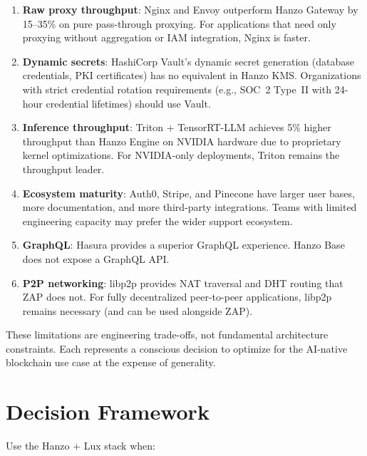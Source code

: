 \documentclass[11pt,twocolumn]{article}
\begin{document}
\begin{enumerate}
    \item \textbf{Raw proxy throughput}: Nginx and Envoy outperform Hanzo Gateway by 15--35\% on pure pass-through proxying. For applications that need only proxying without aggregation or IAM integration, Nginx is faster.

    \item \textbf{Dynamic secrets}: HashiCorp Vault's dynamic secret generation (database credentials, PKI certificates) has no equivalent in Hanzo KMS. Organizations with strict credential rotation requirements (e.g., SOC~2 Type~II with 24-hour credential lifetimes) should use Vault.

    \item \textbf{Inference throughput}: Triton + TensorRT-LLM achieves 5\% higher throughput than Hanzo Engine on NVIDIA hardware due to proprietary kernel optimizations. For NVIDIA-only deployments, Triton remains the throughput leader.

    \item \textbf{Ecosystem maturity}: Auth0, Stripe, and Pinecone have larger user bases, more documentation, and more third-party integrations. Teams with limited engineering capacity may prefer the wider support ecosystem.

    \item \textbf{GraphQL}: Hasura provides a superior GraphQL experience. Hanzo Base does not expose a GraphQL API.

    \item \textbf{P2P networking}: libp2p provides NAT traversal and DHT routing that ZAP does not. For fully decentralized peer-to-peer applications, libp2p remains necessary (and can be used alongside ZAP).
\end{enumerate}

These limitations are engineering trade-offs, not fundamental architecture constraints. Each represents a conscious decision to optimize for the AI-native blockchain use case at the expense of generality.

\section{Decision Framework}
\label{sec:decision}

Use the Hanzo + Lux stack when:
\end{document}
